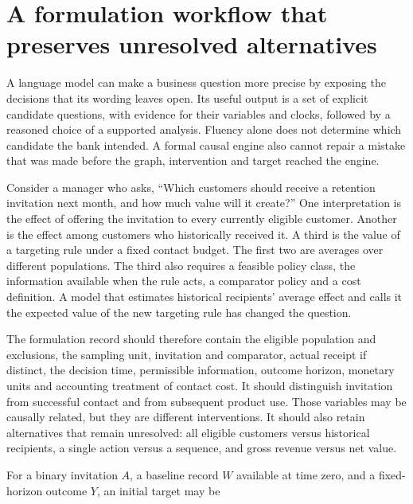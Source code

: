 \hypertarget{a-formulation-workflow-that-preserves-unresolved-alternatives}{%
\section{A formulation workflow that preserves unresolved
alternatives}\label{a-formulation-workflow-that-preserves-unresolved-alternatives}}

\label{exec13:formulation}

A language model can make a business question more precise by exposing
the decisions that its wording leaves open. Its useful output is a set
of explicit candidate questions, with evidence for their variables and
clocks, followed by a reasoned choice of a supported analysis. Fluency
alone does not determine which candidate the bank intended. A formal
causal engine also cannot repair a mistake that was made before the
graph, intervention and target reached the engine.

Consider a manager who asks, ``Which customers should receive a
retention invitation next month, and how much value will it create?''
One interpretation is the effect of offering the invitation to every
currently eligible customer. Another is the effect among customers who
historically received it. A third is the value of a targeting rule under
a fixed contact budget. The first two are averages over different
populations. The third also requires a feasible policy class, the
information available when the rule acts, a comparator policy and a cost
definition. A model that estimates historical recipients' average effect
and calls it the expected value of the new targeting rule has changed
the question.

The formulation record should therefore contain the eligible population
and exclusions, the sampling unit, invitation and comparator, actual
receipt if distinct, the decision time, permissible information, outcome
horizon, monetary units and accounting treatment of contact cost. It
should distinguish invitation from successful contact and from
subsequent product use. Those variables may be causally related, but
they are different interventions. It should also retain alternatives
that remain unresolved: all eligible customers versus historical
recipients, a single action versus a sequence, and gross revenue versus
net value.

For a binary invitation \(A\), a baseline record \(W\) available at time
zero, and a fixed-horizon outcome \(Y\), an initial target may be

